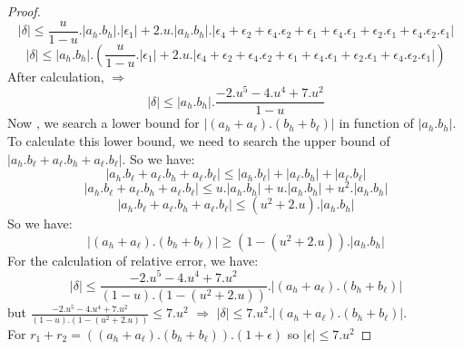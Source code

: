 \begin{proof}
$$ \lvert \delta \rvert \le  \frac{u}{1-u}. \lvert a_h . b_h\rvert. \lvert \epsilon_1 \rvert + 2.u. \lvert a_h . b_h\rvert . \lvert \epsilon_4 + \epsilon_2 + \epsilon_4.\epsilon_2 + \epsilon_1 + \epsilon_4.\epsilon_1 + \epsilon_2.\epsilon_1 + \epsilon_4.\epsilon_2.\epsilon_1 \rvert $$
$$ \lvert \delta \rvert \le   \lvert a_h . b_h\rvert.(\frac{u}{1-u}. \lvert \epsilon_1 \rvert + 2.u. \lvert \epsilon_4 + \epsilon_2 + \epsilon_4.\epsilon_2 + \epsilon_1 + \epsilon_4.\epsilon_1 + \epsilon_2.\epsilon_1 + \epsilon_4.\epsilon_2.\epsilon_1 \rvert) $$
After calculation,
$\Rightarrow$
$$ \lvert \delta \rvert \le   \lvert a_h . b_h\rvert.\frac{-2.u^5 - 4.u^4 + 7.u^2}{1-u}$$
Now , we search a lower bound for $\lvert (a_h + a_{\ell}).(b_h + b_{\ell}) \rvert $ in function of  $\lvert a_h.b_h \rvert $.\\
To calculate this lower bound, we need to search the upper bound of $\lvert a_h.b_{\ell} +a_{\ell}.b_h + a_{\ell}.b_{\ell} \rvert$. So we have:
$$\lvert a_h.b_{\ell} +a_{\ell}.b_h + a_{\ell}.b_{\ell} \rvert \le \lvert a_h.b_{\ell} \rvert + \lvert  a_{\ell}.b_h \rvert + \lvert a_{\ell}.b_{\ell} \rvert $$
$$\lvert a_h.b_{\ell} +a_{\ell}.b_h + a_{\ell}.b_{\ell} \rvert \le u.\lvert a_h.b_h \rvert + u.\lvert  a_h.b_h \rvert + u^2.\lvert a_h.b_h \rvert $$
$$\lvert a_h.b_{\ell} +a_{\ell}.b_h + a_{\ell}.b_{\ell} \rvert \le (u^2+2.u).\lvert a_h.b_h \rvert $$
So we have:
$$\lvert (a_h +a_{\ell}).(b_h + b_{\ell}) \rvert \ge (1 - (u^2+2.u)).\lvert a_h.b_h \rvert  $$
For the calculation of relative error, we have:
$$\lvert \delta \rvert \le   \frac{-2.u^5 - 4.u^4 + 7.u^2}{(1-u).(1 - (u^2+2.u))}.\lvert (a_h + a_{\ell}).(b_h + b_{\ell})\rvert $$
but $\frac{-2.u^5 - 4.u^4 + 7.u^2}{(1-u).(1 - (u^2+2.u))} \le 7.u^2$
$\Rightarrow$ $\lvert \delta \rvert \le  7.u^2.\lvert (a_h + a_{\ell}).(b_h + b_{\ell}) \lvert $.\\
For $r_1+r_2 = ((a_h+a_{\ell}). (b_h+b_{\ell})).(1+\epsilon)$
so $\lvert \epsilon \rvert \le 7.u^2$
\end{proof}